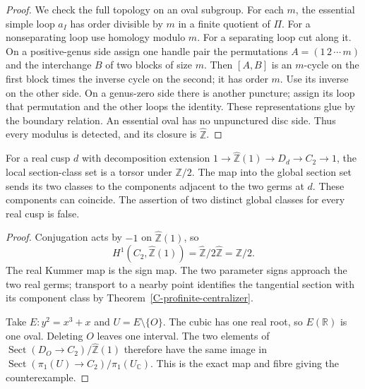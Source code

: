 \begin{proof}
We check the full topology on an oval subgroup.
For each $m$, the essential simple loop $a_I$
has order divisible by $m$ in a finite quotient of $\Pi$.
For a nonseparating loop use homology modulo $m$.
For a separating loop cut along it. On a positive-genus
side assign one handle pair the permutations
$A=(1\,2\,\cdots\,m)$ and the interchange $B$ of
two blocks of size $m$. Then $[A,B]$ is an
$m$-cycle on the first block times the inverse cycle
on the second; it has order $m$. Use its inverse
on the other side. On a genus-zero side there is
another puncture; assign its loop that permutation
and the other loops the identity. These representations
glue by the boundary relation. An essential oval
has no unpunctured disc side. Thus every modulus
is detected, and its closure is $\widehat{\mathbb Z}$.
\end{proof}

\begin{proposition}
\label{C-cusp-packet}
For a real cusp $d$ with decomposition extension
$1\to\widehat{\mathbb Z}(1)\to D_d\to C_2\to1$,
the local section-class set is a torsor under
$\mathbb Z/2$. The map into the global section set
sends its two classes to the components adjacent
to the two germs at $d$. These components can coincide.
The assertion of two distinct global classes for
every real cusp is false.
\end{proposition}
\begin{proof}
Conjugation acts by $-1$ on $\widehat{\mathbb Z}(1)$, so
\[
 H^1(C_2,\widehat{\mathbb Z}(1))
 =\widehat{\mathbb Z}/2\widehat{\mathbb Z}=\mathbb Z/2.
\]
The real Kummer map is the sign map. The two parameter
signs approach the two real germs; transport to a nearby
point identifies the tangential section with its component
class by Theorem~\ref{C-profinite-centralizer}.

Take $E:y^2=x^3+x$ and $U=E\setminus\{O\}$.
The cubic has one real root, so $E(\mathbb R)$ is one
oval. Deleting $O$ leaves one interval. The two
elements of $\operatorname{Sect}(D_O\to C_2)/
\widehat{\mathbb Z}(1)$ therefore have the same
image in $\operatorname{Sect}(\pi_1(U)\to C_2)/
\pi_1(U_{\mathbb C})$. This is the exact map and
fibre giving the counterexample.
\end{proof}

